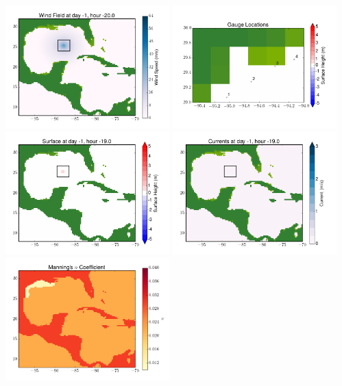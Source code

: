 \documentclass[11pt]{article}
\begin{document}
\vskip 10pt 
\includegraphics[width=0.475\textwidth]{frame0028fig9.png}
\includegraphics[width=0.475\textwidth]{frame0028fig10.png}
\vskip 10pt 
\includegraphics[width=0.475\textwidth]{frame0029fig1.png}
\includegraphics[width=0.475\textwidth]{frame0029fig2.png}
\vskip 10pt 
\includegraphics[width=0.475\textwidth]{frame0029fig3.png}
\end{document}
